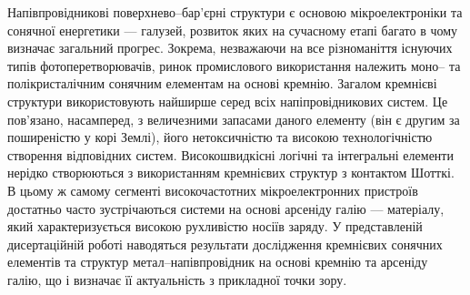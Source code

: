 %
%
%
%
%
%
%
%
%
%

{\actualityTXT}
Напівпровідникові поверхнево--бар'єрні структури є основою мікроелектроніки та сонячної енергетики --- галузей, розвиток яких на сучасному етапі багато в чому визначає загальний прогрес.
Зокрема, незважаючи на все різноманіття існуючих типів фотоперетворювачів, ринок промислового використання належить моно-- та полікристалічним сонячним елементам на основі кремнію.
Загалом кремнієві структури використовують найширше серед всіх напіпровідникових систем.
Це пов'язано, насамперед, з величезними запасами даного елементу (він є другим за поширеністю у корі Землі), його нетоксичністю та високою технологічністю створення відповідних систем.
Високошвидкісні логічні та інтегральні елементи нерідко створюються з використанням кремнієвих структур з контактом Шотткі.
В цьому ж самому сегменті високочастотних мікроелектронних пристроїв достатньо часто зустрічаються системи на основі арсеніду галію --- матеріалу, який характеризується високою рухливістю носіїв заряду.
У представленій дисертаційній роботі наводяться результати дослідження кремнієвих сонячних елементів та структур метал--напівпровідник на основі кремнію та арсеніду галію, що і визначає її актуальність з прикладної точки зору.


